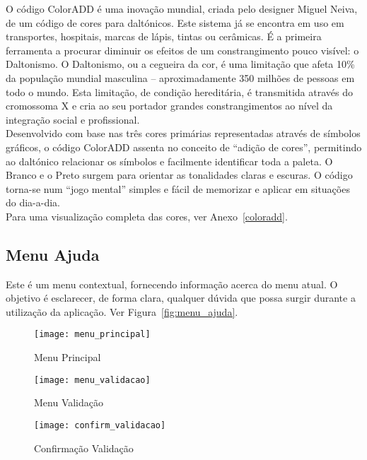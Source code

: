 O código ColorADD é uma inovação mundial, criada pelo designer Miguel Neiva, de um código de cores para daltónicos. Este sistema já se encontra em uso em transportes, hospitais, marcas de lápis, tintas ou cerâmicas. É a primeira ferramenta a procurar diminuir os efeitos de um constrangimento pouco visível: o Daltonismo. O Daltonismo, ou a cegueira da cor, é uma limitação que afeta 10\% da população mundial masculina – aproximadamente 350 milhões de pessoas em todo o mundo. Esta limitação, de condição hereditária, é transmitida através do cromossoma X e cria ao seu portador grandes constrangimentos ao nível da integração social e profissional.
\\Desenvolvido com base nas três cores primárias representadas através de símbolos gráficos, o código ColorADD assenta no conceito de “adição de cores”, permitindo ao daltónico relacionar os símbolos e facilmente identificar toda a paleta. O Branco e o Preto surgem para orientar as tonalidades claras e escuras. O código torna-se num “jogo mental” simples e fácil de memorizar e aplicar em situações do dia-a-dia. \cite{coloradd}
\\Para uma visualização completa das cores, ver Anexo~\ref{coloradd}.

\subsection{Menu Ajuda}

Este é um menu contextual, fornecendo informação acerca do menu atual. O objetivo é esclarecer, de forma clara, qualquer dúvida que possa surgir durante a utilização da aplicação. Ver Figura~\ref{fig:menu_ajuda}.

\begin{figure}[t]
  \begin{center}
    \leavevmode
    \texttt{[image: menu\_principal]}
    \caption{Menu Principal}
    \label{fig:menu_principal}
  \end{center}
\end{figure}

\begin{figure}[ht]
\begin{minipage}[b]{0.45\linewidth}
\centering
\texttt{[image: menu\_validacao]}
    \caption{Menu Validação}
    \label{fig:menu_validacao}
\end{minipage}
\hspace{0.5cm}
\begin{minipage}[b]{0.45\linewidth}
\centering
    \texttt{[image: confirm\_validacao]}
    \caption{Confirmação Validação}
    \label{fig:confirm_validacao}
\end{minipage}
\end{figure}

